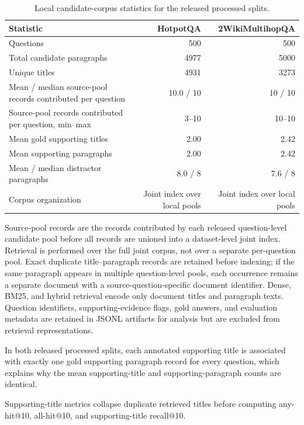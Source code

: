 \begin{table}[t]
\centering
\caption{Local candidate-corpus statistics for the released processed splits.}
\label{tab:corpus_statistics}
\small
\begin{threeparttable}
\setlength{\tabcolsep}{5pt}
\begin{tabularx}{\textwidth}{>{\raggedright\arraybackslash}X r r}
\toprule
Statistic & HotpotQA & 2WikiMultihopQA \\
\midrule
Questions & 500 & 500 \\
Total candidate paragraphs & 4977 & 5000 \\
Unique titles & 4931 & 3273 \\
Mean / median source-pool records contributed per question & 10.0 / 10 & 10 / 10 \\
Source-pool records contributed per question, min--max & 3--10 & 10--10 \\
Mean gold supporting titles & 2.00 & 2.42 \\
Mean supporting paragraphs & 2.00 & 2.42 \\
Mean / median distractor paragraphs & 8.0 / 8 & 7.6 / 8 \\
Corpus organization & Joint index over local pools & Joint index over local pools \\
\bottomrule
\end{tabularx}
\begin{tablenotes}
\footnotesize
\item Source-pool records are the records contributed by each released question-level candidate pool before all records are unioned into a dataset-level joint index. Retrieval is performed over the full joint corpus, not over a separate per-question pool. Exact duplicate title--paragraph records are retained before indexing; if the same paragraph appears in multiple question-level pools, each occurrence remains a separate document with a source-question-specific document identifier. Dense, BM25, and hybrid retrieval encode only document titles and paragraph texts. Question identifiers, supporting-evidence flags, gold answers, and evaluation metadata are retained in JSONL artifacts for analysis but are excluded from retrieval representations.
\item In both released processed splits, each annotated supporting title is associated with exactly one gold supporting paragraph record for every question, which explains why the mean supporting-title and supporting-paragraph counts are identical.
\item Supporting-title metrics collapse duplicate retrieved titles before computing any-hit@10, all-hit@10, and supporting-title recall@10.
\end{tablenotes}
\end{threeparttable}
\end{table}
